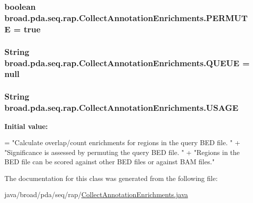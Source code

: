 \hypertarget{classbroad_1_1pda_1_1seq_1_1rap_1_1_collect_annotation_enrichments_a8851c2e5ce1654a08306fe7872585dfe}{
\subsubsection[{P\+E\+R\+M\+U\+T\+E}]{\setlength{\rightskip}{0pt plus 5cm}boolean broad.\+pda.\+seq.\+rap.\+Collect\+Annotation\+Enrichments.\+P\+E\+R\+M\+U\+T\+E = true}}\label{classbroad_1_1pda_1_1seq_1_1rap_1_1_collect_annotation_enrichments_a8851c2e5ce1654a08306fe7872585dfe}
\hypertarget{classbroad_1_1pda_1_1seq_1_1rap_1_1_collect_annotation_enrichments_aebdccdcadf5f886a471d5fabce63b368}{
\subsubsection[{Q\+U\+E\+U\+E}]{\setlength{\rightskip}{0pt plus 5cm}String broad.\+pda.\+seq.\+rap.\+Collect\+Annotation\+Enrichments.\+Q\+U\+E\+U\+E = null}}\label{classbroad_1_1pda_1_1seq_1_1rap_1_1_collect_annotation_enrichments_aebdccdcadf5f886a471d5fabce63b368}
\hypertarget{classbroad_1_1pda_1_1seq_1_1rap_1_1_collect_annotation_enrichments_ab37d1fbdfd1e2cb829d8eb0b7a9e2b47}{
\subsubsection[{U\+S\+A\+G\+E}]{\setlength{\rightskip}{0pt plus 5cm}String broad.\+pda.\+seq.\+rap.\+Collect\+Annotation\+Enrichments.\+U\+S\+A\+G\+E}}\label{classbroad_1_1pda_1_1seq_1_1rap_1_1_collect_annotation_enrichments_ab37d1fbdfd1e2cb829d8eb0b7a9e2b47}
{\bfseries Initial value\+:}
\begin{DoxyCode}
= \textcolor{stringliteral}{"Calculate overlap/count enrichments for regions in the query BED file.  "} + 
                          \textcolor{stringliteral}{"Significance is assessed by permuting the query BED file.  "} + 
                          \textcolor{stringliteral}{"Regions in the BED file can be scored against other BED files or against BAM
       files."}
\end{DoxyCode}


The documentation for this class was generated from the following file\+:\begin{DoxyCompactItemize}
\item 
java/broad/pda/seq/rap/\hyperlink{_collect_annotation_enrichments_8java}{Collect\+Annotation\+Enrichments.\+java}\end{DoxyCompactItemize}
